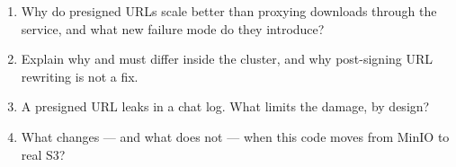 \begin{quiz}
\begin{enumerate}
  \item Why do presigned URLs scale better than proxying downloads
  through the service, and what new failure mode do they introduce?
  \item Explain why  and  must
  differ inside the cluster, and why post-signing URL rewriting is not a
  fix.
  \item A presigned URL leaks in a chat log. What limits the damage, by
  design?
  \item What changes --- and what does not --- when this code moves from
  MinIO to real S3?
\end{enumerate}
\end{quiz}
